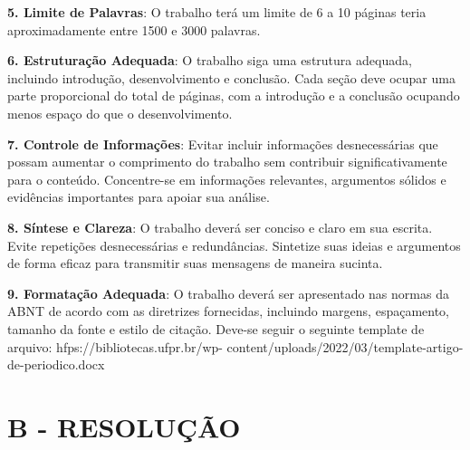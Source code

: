 \textbf{5. Limite de Palavras}: O trabalho terá um limite de 6 a 10 páginas teria aproximadamente entre 1500 e 3000
palavras.

\textbf{6. Estruturação Adequada}: O trabalho siga uma estrutura adequada, incluindo introdução, desenvolvimento e
conclusão. Cada seção deve ocupar uma parte proporcional do total de páginas, com a introdução e a conclusão ocupando
menos espaço do que o desenvolvimento.

\textbf{7. Controle de Informações}: Evitar incluir informações desnecessárias que possam aumentar o comprimento do
trabalho sem contribuir significativamente para o conteúdo. Concentre-se em informações relevantes, argumentos sólidos
e evidências importantes para apoiar sua análise.

\textbf{8. Síntese e Clareza}: O trabalho deverá ser conciso e claro em sua escrita. Evite repetições desnecessárias e
redundâncias. Sintetize suas ideias e argumentos de forma eficaz para transmitir suas mensagens de maneira sucinta. 

\textbf{9. Formatação Adequada}: O trabalho deverá ser apresentado nas normas da ABNT de acordo com as diretrizes
fornecidas, incluindo margens, espaçamento, tamanho da fonte e estilo de citação. Deve-se seguir o seguinte template de
arquivo: hfps://bibliotecas.ufpr.br/wp- content/uploads/2022/03/template-artigo-de-periodico.docx


\section*{\textbf{B - RESOLUÇÃO}}
\lipsum[30]